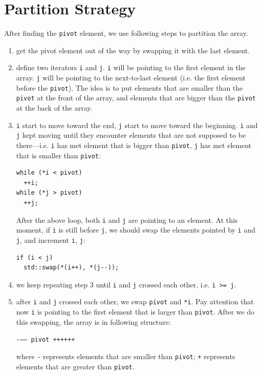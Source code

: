 \documentclass[12pt]{book}
\begin{document}
\section{Partition Strategy}
\label{sec:org0a7c075}
After finding the \texttt{pivot} element, we use following steps to partition the array.
\begin{enumerate}
\item get the pivot element out of the way by swapping it with the last element.
\item define two iterators \texttt{i} and \texttt{j}. \texttt{i} will be pointing to the first element in the array. \texttt{j} will be pointing to the next-to-last element (i.e. the first element before the \texttt{pivot}). The idea is to put elements that are smaller than the \texttt{pivot} at the front of the array, and elements that are bigger than the \texttt{pivot} at the back of the array.
\item \texttt{i} start to move toward the end, \texttt{j} start to move toward the beginning. \texttt{i} and \texttt{j} kept moving until they encounter elements that are not supposed to be there---i.e. \texttt{i} has met element that is bigger than \texttt{pivot}, \texttt{j} has met element that is smaller than \texttt{pivot}:
\begin{verbatim}
while (*i < pivot)
  ++i;
while (*j > pivot)
  ++j;
\end{verbatim}
After the above loop, both \texttt{i} and \texttt{j} are pointing to an element. At this moment, if \texttt{i} is still before \texttt{j}, we should swap the elements pointed by \texttt{i} and \texttt{j}, and increment \texttt{i}, \texttt{j}:
\begin{verbatim}
if (i < j)
  std::swap(*(i++), *(j--));
\end{verbatim}
\item we keep repeating step 3 until \texttt{i} and \texttt{j} crossed each other, i.e. \texttt{i >= j}.
\item after \texttt{i} and \texttt{j} crossed each other, we swap \texttt{pivot} and \texttt{*i}. Pay attention that now \texttt{i} is pointing to the first element that is larger than \texttt{pivot}. After we do this swapping, the array is in following structure:

\texttt{-{}--{}-- pivot ++++++}

where \texttt{-} represents elements that are smaller than \texttt{pivot}; \texttt{+} represents elements that are greater than \texttt{pivot}.
\end{enumerate}
\end{document}
